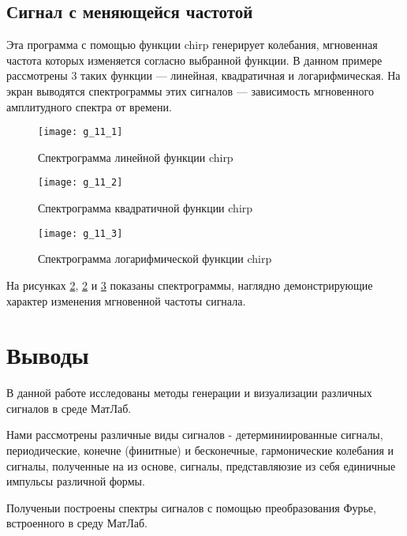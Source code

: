 \subsection{Сигнал с меняющейся частотой}


\parindent=1cm
Эта программа с помощью функции chirp генерирует колебания, мгновенная частота которых изменяется согласно выбранной функции. В данном примере рассмотрены 3 таких функции — линейная, квадратичная и логарифмическая. На экран выводятся спектрограммы этих сигналов — зависимость мгновенного амплитудного спектра от времени.

\begin{figure}[H]
	\begin{center}
		\texttt{[image: g\_11\_1]}
		\caption{Спектрограмма линейной функции chirp} 
		\label{pic:g_11_1} %
	\end{center}
\end{figure}
\begin{figure}[H]
	\begin{center}
		\texttt{[image: g\_11\_2]}
		\caption{Спектрограмма квадратичной функции chirp} 
		\label{pic:g_11_2} %
	\end{center}
\end{figure}
\begin{figure}[H]
	\begin{center}
		\texttt{[image: g\_11\_3]}
		\caption{Спектрограмма логарифмической функции chirp} 
		\label{pic:g_11_3} %
	\end{center}
\end{figure}
На рисунках \ref{pic:g_11_2}, \ref{pic:g_11_2} и \ref{pic:g_11_3} показаны спектрограммы, наглядно демонстрирующие характер изменения мгновенной частоты сигнала.

\section{Выводы}

В данной работе исследованы методы генерации и визуализации различных сигналов в среде МатЛаб. 

Нами рассмотрены различные виды сигналов - детерминиированные сигналы, периодические, конечне (финитные) и бесконечные, гармонические колебания и сигналы, полученные на из основе, сигналы, представляюзие из себя единичные импульсы различной формы.

Полученыи построены спектры сигналов с помощью преобразования Фурье, встроенного в среду МатЛаб.


